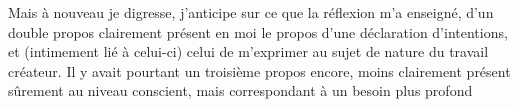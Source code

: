 Mais à nouveau je digresse,  j'anticipe sur ce que la réflexion m'a enseigné,
d'un double propos clairement présent en moi
le propos d'une déclaration d'intentions, et (intimement lié à celui-ci)
celui de m'exprimer au sujet de  nature du travail créateur.
Il y avait pourtant un troisième propos encore, moins clairement présent sûrement au niveau conscient,
mais correspondant à un besoin plus profond
